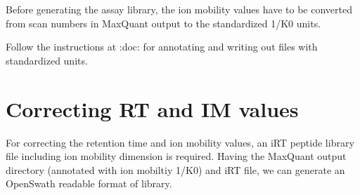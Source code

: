 \documentclass[letterpaper,10pt,english]{sphinxmanual}
\begin{document}
Before generating the assay library, the ion mobility values have to be
converted from scan numbers in MaxQuant output to the standardized 1/K0
units.

Follow the instructions at :doc:  for annotating
and writing out files with standardized units.


\section{Correcting RT and IM values}
\label{\detokenize{librarygeneration:correcting-rt-and-im-values}}
For correcting the retention time and ion mobility values, an iRT peptide
library file including ion mobility dimension is required. Having the
MaxQuant output directory (annotated with ion mobiltiy 1/K0) and iRT file,
we can generate an OpenSwath readable format of library.

\begin{sphinxVerbatim}[commandchars=\\\{\}]
   
   

     
  
  

       \PYGZbs{}
  

       
\end{sphinxVerbatim}
\end{document}
